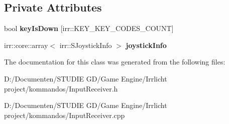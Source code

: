\subsection*{Private Attributes}
\begin{DoxyCompactItemize}
\item 
\mbox{\label{class_input_receiver_a86ce1bb3b52f6bb3499224a508178f10}} 
bool {\bfseries key\+Is\+Down} \mbox{[}irr\+::\+K\+E\+Y\+\_\+\+K\+E\+Y\+\_\+\+C\+O\+D\+E\+S\+\_\+\+C\+O\+U\+NT\mbox{]}
\item 
\mbox{\label{class_input_receiver_ab201d50024317b870b7020843033fd4a}} 
irr\+::core\+::array$<$ irr\+::\+S\+Joystick\+Info $>$ {\bfseries joystick\+Info}
\end{DoxyCompactItemize}


The documentation for this class was generated from the following files\+:\begin{DoxyCompactItemize}
\item 
D\+:/\+Documenten/\+S\+T\+U\+D\+I\+E G\+D/\+Game Engine/\+Irrlicht project/kommandos/Input\+Receiver.\+h\item 
D\+:/\+Documenten/\+S\+T\+U\+D\+I\+E G\+D/\+Game Engine/\+Irrlicht project/kommandos/Input\+Receiver.\+cpp\end{DoxyCompactItemize}
